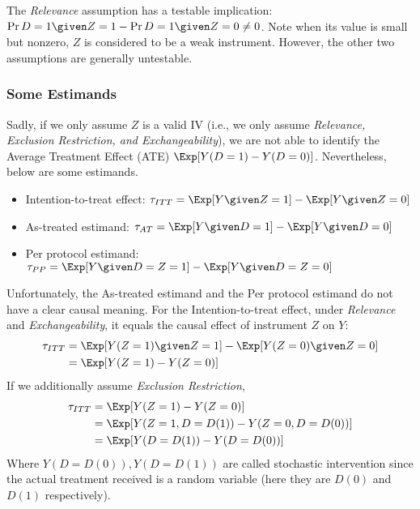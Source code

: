 The \textit{Relevance} assumption has a testable implication: \(\Pr{D = 1 \given Z = 1} - \Pr{D = 1 \given Z = 0} \neq 0\). Note when its value is small but nonzero, \(Z\) is considered to be a weak instrument. However, the other two assumptions are generally untestable.

\subsubsection{Some Estimands}
Sadly, if we only assume \(Z\) is a valid IV (i.e., we only assume \textit{Relevance, Exclusion Restriction, and Exchangeability}), we are not able to identify the Average Treatment Effect (ATE) \(\Exp[Y(D = 1) - Y(D = 0)]\). Nevertheless, below are some estimands.
\begin{itemize}
    \item Intention-to-treat effect: \(\tau_{ITT} = \Exp[Y \given Z = 1] - \Exp[Y \given Z = 0]\)
    \item As-treated estimand: \(\tau_{AT} = \Exp[Y \given D = 1] - \Exp[Y \given D = 0]\)
    \item Per protocol estimand: \(\tau_{PP} = \Exp[Y \given D = Z = 1] - \Exp[Y \given D = Z = 0]\)
\end{itemize}
Unfortunately, the As-treated estimand and the Per protocol estimand do not have a clear causal meaning. For the Intention-to-treat effect, under \textit{Relevance} and \textit{Exchangeability}, it equals the causal effect of instrument \(Z\) on \(Y\): 
\begin{align*}
    \tau_{ITT} &= \Exp[Y(Z = 1) \given Z = 1] - \Exp[Y(Z = 0) \given Z = 0] \\
    &= \Exp[Y(Z = 1) - Y(Z = 0)]
\end{align*}
If we additionally assume \textit{Exclusion Restriction}, 
\begin{align*}
    \tau_{ITT} &= \Exp[Y(Z = 1) - Y(Z = 0)] \\
    &= \Exp[Y(Z = 1, D = D(1)) - Y(Z = 0, D = D(0))] \\
    &= \Exp[Y(D = D(1)) - Y(D = D(0))]
\end{align*}
Where \(Y(D = D(0)), Y(D = D(1))\) are called stochastic intervention since the actual treatment received is a random variable (here they are \(D(0)\) and \(D(1)\) respectively). 

